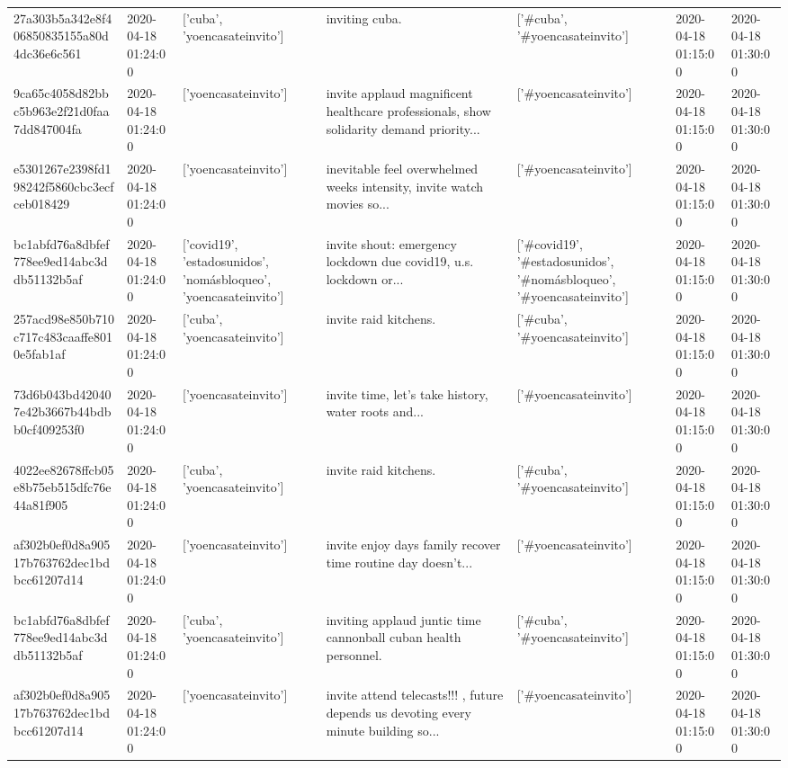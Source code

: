 \begin{tabular}{lllllll}
27a303b5a342e8f406850835155a80d4dc36e6c561 & 2020-04-18 01:24:00 & ['cuba', 'yoencasateinvito'] & inviting cuba. & ['#cuba', '#yoencasateinvito'] & 2020-04-18 01:15:00 & 2020-04-18 01:30:00 \\
9ca65c4058d82bbc5b963e2f21d0faa7dd847004fa & 2020-04-18 01:24:00 & ['yoencasateinvito'] & invite applaud magnificent healthcare professionals, show solidarity demand priority... & ['#yoencasateinvito'] & 2020-04-18 01:15:00 & 2020-04-18 01:30:00 \\
e5301267e2398fd198242f5860cbc3ecfceb018429 & 2020-04-18 01:24:00 & ['yoencasateinvito'] & inevitable feel overwhelmed weeks intensity, invite watch movies so... & ['#yoencasateinvito'] & 2020-04-18 01:15:00 & 2020-04-18 01:30:00 \\
bc1abfd76a8dbfef778ee9ed14abc3ddb51132b5af & 2020-04-18 01:24:00 & ['covid19', 'estadosunidos', 'nomásbloqueo', 'yoencasateinvito'] & invite shout: emergency lockdown due covid19, u.s. lockdown or... & ['#covid19', '#estadosunidos', '#nomásbloqueo', '#yoencasateinvito'] & 2020-04-18 01:15:00 & 2020-04-18 01:30:00 \\
257acd98e850b710c717c483caaffe8010e5fab1af & 2020-04-18 01:24:00 & ['cuba', 'yoencasateinvito'] & invite raid kitchens. & ['#cuba', '#yoencasateinvito'] & 2020-04-18 01:15:00 & 2020-04-18 01:30:00 \\
73d6b043bd420407e42b3667b44bdbb0cf409253f0 & 2020-04-18 01:24:00 & ['yoencasateinvito'] & invite time, let's take history, water roots and... & ['#yoencasateinvito'] & 2020-04-18 01:15:00 & 2020-04-18 01:30:00 \\
4022ee82678ffcb05e8b75eb515dfc76e44a81f905 & 2020-04-18 01:24:00 & ['cuba', 'yoencasateinvito'] & invite raid kitchens. & ['#cuba', '#yoencasateinvito'] & 2020-04-18 01:15:00 & 2020-04-18 01:30:00 \\
af302b0ef0d8a90517b763762dec1bdbcc61207d14 & 2020-04-18 01:24:00 & ['yoencasateinvito'] & invite enjoy days family recover time routine day doesn't... & ['#yoencasateinvito'] & 2020-04-18 01:15:00 & 2020-04-18 01:30:00 \\
bc1abfd76a8dbfef778ee9ed14abc3ddb51132b5af & 2020-04-18 01:24:00 & ['cuba', 'yoencasateinvito'] & inviting applaud juntic time cannonball cuban health personnel. & ['#cuba', '#yoencasateinvito'] & 2020-04-18 01:15:00 & 2020-04-18 01:30:00 \\
af302b0ef0d8a90517b763762dec1bdbcc61207d14 & 2020-04-18 01:24:00 & ['yoencasateinvito'] & invite attend telecasts!!! , future depends us devoting every minute building so... & ['#yoencasateinvito'] & 2020-04-18 01:15:00 & 2020-04-18 01:30:00 \\

\end{tabular}
